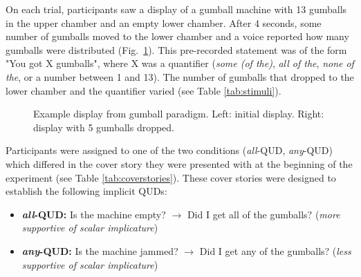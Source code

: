 \documentclass[10pt,letterpaper]{article}
\begin{document}
On each trial, participants saw a display of a gumball machine with 13 gumballs in the upper chamber and an empty lower chamber. After 4 seconds, some number of gumballs moved to the lower chamber and a voice reported how many gumballs were distributed (Fig.~\ref{fig:gumball-paradigm}). This pre-recorded statement was of the form "You got X gumballs", where X was a quantifier (\textit{some (of the)},  \textit{all of the}, \textit{none of the}, or a number between 1 and 13). The number of gumballs that dropped to the lower chamber and the quantifier  varied (see Table \ref{tab:stimuli}).

\begin{figure}
\centering
{}
\caption{Example display from gumball paradigm. Left: initial display. Right: display with 5 gumballs dropped.  \label{fig:gumball-paradigm}}
\end{figure}

Participants were assigned to one of the two conditions (\textit{all}-QUD, \textit{any}-QUD) which differed in the cover story they were presented with at the beginning of the experiment (see Table \ref{tab:coverstories}). These cover stories were designed to establish the following implicit QUDs:
\begin{itemize}
\item \textbf{\textit{all}-QUD:} Is the machine empty? $\rightarrow$ Did I get all of the gumballs? (\textit{more supportive of scalar implicature})
\item \textbf{\textit{any}-QUD:} Is the machine jammed? $\rightarrow$ Did I get any of the gumballs? (\textit{less supportive of scalar implicature})
\end{itemize}
\end{document}
